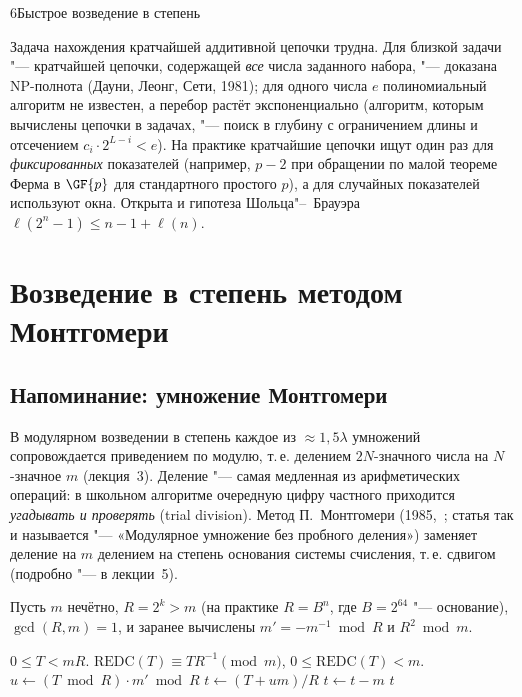 \begin{lecture}{6}{Быстрое возведение в степень}

\begin{remark}
Задача нахождения кратчайшей аддитивной цепочки трудна. Для близкой задачи "--- кратчайшей
цепочки, содержащей \emph{все} числа заданного набора, "--- доказана NP-полнота
(Дауни, Леонг, Сети, 1981); для одного числа $e$ полиномиальный алгоритм не известен, а
перебор растёт экспоненциально (алгоритм, которым вычислены цепочки в задачах, "--- поиск
в глубину с ограничением длины и отсечением $c_i \cdot 2^{L - i} < e$). На практике кратчайшие
цепочки ищут один раз для \emph{фиксированных} показателей (например, $p - 2$ при обращении
по малой теореме Ферма в $\GF{p}$ для стандартного простого $p$), а для случайных показателей
используют окна. Открыта и гипотеза Шольца"--~Брауэра $\ell(2^n - 1) \le n - 1 + \ell(n)$.
\end{remark}


\section{Возведение в степень методом Монтгомери}\label{l6:sec-montgomery}

\subsection{Напоминание: умножение Монтгомери}

В модулярном возведении в степень каждое из $\approx 1{,}5\lambda$ умножений сопровождается
приведением по модулю, т.\,е. делением $2N$-значного числа на $N$-значное $m$ (лекция~3).
Деление "--- самая медленная из арифметических операций: в школьном алгоритме очередную цифру
частного приходится \emph{угадывать и проверять} (trial division). Метод П.~Монтгомери
(1985,~\cite{montgomery}; статья так и называется "--- «Модулярное умножение без пробного
деления») заменяет деление на $m$ делением на степень основания системы счисления, т.\,е. сдвигом
(подробно "--- в лекции~5).

Пусть $m$ нечётно, $R = 2^k > m$ (на практике $R = B^n$, где $B = 2^{64}$ "--- основание),
$\gcd(R, m) = 1$, и заранее вычислены $m' = -m^{-1} \bmod R$ и $R^2 \bmod m$.

\begin{algorithm}[REDC]\label{l6:redc}
\begin{algorithmic}[1]
\Require $0 \le T < mR$.
\Ensure $\mathrm{REDC}(T) \equiv T R^{-1} \pmod m$, $0 \le \mathrm{REDC}(T) < m$.
\State $u \gets (T \bmod R) \cdot m' \bmod R$ 
\State $t \gets (T + u m) / R$ 
 $t \gets t - m$ \EndIf
\State \Return $t$
\end{algorithmic}
\end{algorithm}


\end{lecture}
